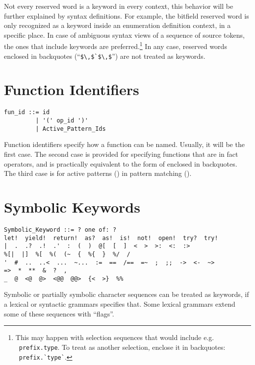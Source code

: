Not every reserved word is a keyword in every context, this behavior will be further explained by syntax definitions. For example, the bitfield reserved word is only recognized as a keyword inside an enumeration definition context, in a specific place. In case of ambiguous syntax views of a sequence of source tokens, the ones that include keywords are preferred.\footnote{This may happen with selection sequences that would include e.g. ~\lstinline!prefix.type!. To treat  as another selection, enclose it in backquotes: ~\lstinline[deletekeywords={type}]!prefix.`type`!.} In any case, reserved words enclosed in backquotes (``\lstinline!$\,$`$\,$!'') are not treated as keywords. 




\section{Function Identifiers}
\label{sec:function-identifiers}

\syntax\begin{lstlisting}
fun_id ::= id
         | '(' op_id ')'
         | Active_Pattern_Ids
\end{lstlisting}

Function identifiers specify how a function can be named. Usually, it will be the first case. The second case is provided for specifying functions that are in fact operators, and is practically equivalent to the form of  enclosed in backquotes. The third case is for active patterns () in pattern matching (). 





\section{Symbolic Keywords}
\label{sec:symbolic-keywords}

\syntax\begin{lstlisting}[deletekeywords={of}]
Symbolic_Keyword ::= ? one of: ?
let!  yield!  return!  as?  as!  is!  not!  open!  try?  try!
|  .  .?  .!  .'  :  (  )  @[  [  ]  <  >  >:  <:  :>
%[|  |]  %[  %(  (~  {  %{  }  %/  /
'  #  ..  ..<  ...  ~...  :=  ==  /==  =~  ;  ;;  ->  <-  ~>
=>  *  **  &  ?  ,
_  @  <@  @>  <@@  @@>  {<  >}  %%
\end{lstlisting}

Symbolic or partially symbolic character sequences can be treated as keywords, if a lexical or syntactic grammars specifies that. Some lexical grammars extend some of these sequences with ``flags''. 





